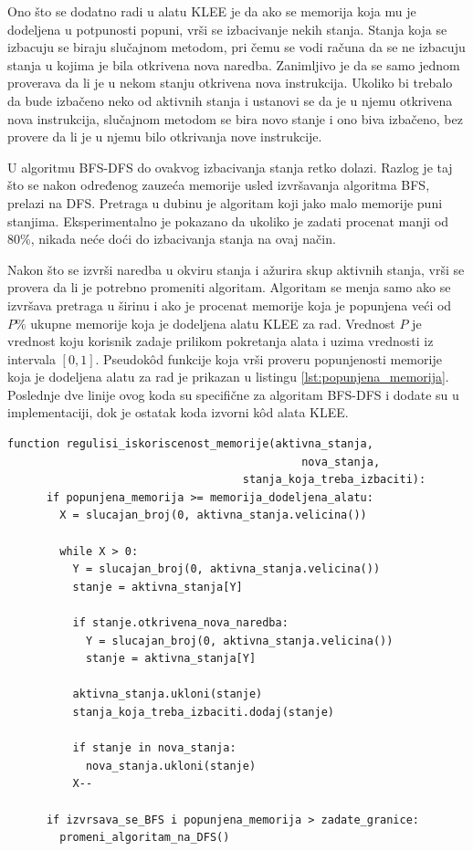 \documentclass[12pt,oneside]{memoir}
\begin{document}
Ono što se dodatno radi u alatu KLEE je da ako se memorija koja mu je dodeljena u potpunosti popuni, vrši se izbacivanje nekih stanja. Stanja koja se izbacuju se biraju slučajnom metodom, pri čemu se vodi računa da se ne izbacuju stanja u kojima je bila otkrivena nova naredba. Zanimljivo je da se samo jednom proverava da li je u nekom stanju otkrivena nova instrukcija. Ukoliko bi trebalo da bude izbačeno neko od aktivnih stanja i ustanovi se da je u njemu otkrivena nova instrukcija, slučajnom metodom se bira novo stanje i ono biva izbačeno, bez provere da li je u njemu bilo otkrivanja nove instrukcije. 

U algoritmu BFS-DFS do ovakvog izbacivanja stanja retko dolazi. Razlog je taj što se nakon određenog zauzeća memorije usled izvršavanja algoritma BFS, prelazi na DFS. Pretraga u dubinu je algoritam koji jako malo memorije puni stanjima. Eksperimentalno je pokazano da ukoliko je zadati procenat manji od 80\%, nikada neće doći do izbacivanja stanja na ovaj način. 

Nakon što se izvrši naredba u okviru stanja i ažurira skup aktivnih stanja, vrši se provera da li je potrebno promeniti algoritam. Algoritam se menja samo ako se izvršava pretraga u širinu i ako je procenat memorije koja je popunjena veći od $P\%$ ukupne memorije koja je dodeljena alatu KLEE za rad. Vrednost $P$ je vrednost koju korisnik zadaje prilikom pokretanja alata i uzima vrednosti iz intervala $[0, 1]$. Pseudok\^od funkcije koja vrši proveru popunjenosti memorije koja je dodeljena alatu za rad je prikazan u listingu \ref{lst:popunjena_memorija}. Poslednje dve linije ovog koda su specifične za algoritam BFS-DFS i dodate su u implementaciji, dok je ostatak koda izvorni k\^od alata KLEE.

\begin{lstlisting}[caption={Pseudok\^od funkcije koja proverava koliko je memorije popunjeno},captionpos=b,label={lst:popunjena_memorija}]
    function regulisi_iskoriscenost_memorije(aktivna_stanja, 
                                             nova_stanja,
                                    stanja_koja_treba_izbaciti):
      if popunjena_memorija >= memorija_dodeljena_alatu:
        X = slucajan_broj(0, aktivna_stanja.velicina())

        while X > 0:
          Y = slucajan_broj(0, aktivna_stanja.velicina())
          stanje = aktivna_stanja[Y]
          
          if stanje.otkrivena_nova_naredba:
            Y = slucajan_broj(0, aktivna_stanja.velicina())
            stanje = aktivna_stanja[Y]

          aktivna_stanja.ukloni(stanje)
          stanja_koja_treba_izbaciti.dodaj(stanje)
          
          if stanje in nova_stanja:
            nova_stanja.ukloni(stanje)
          X--
          
      if izvrsava_se_BFS i popunjena_memorija > zadate_granice:
        promeni_algoritam_na_DFS()
    \end{lstlisting}
\end{document}

